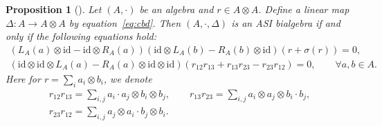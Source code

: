 \documentclass[pdftex]{sigma}
\numberwithin{equation}{section}
\newtheorem{Proposition}[Theorem]{Proposition}
{ \theoremstyle{definition}
	\newtheorem{Definition}[Theorem]{Definition}
	\newtheorem{Note}[Theorem]{Note}
	\newtheorem{Example}[Theorem]{Example}
	\newtheorem{Remark}[Theorem]{Remark} }
\newcommand{\id}{\mathrm{id}}
\begin{document}
\begin{Proposition}[{\cite[Theorem~2.3.5]{BaiDouble}}]\label{pro:cobasi}
Let $(A, \cdot)$ be an algebra and $r \in A \otimes A$.
 Define a linear map $\Delta\colon A \to A \otimes A$ by equation~\eqref{eq:cbd}.
 Then $(A, \cdot, \Delta)$ is an ASI bialgebra if and only if the following equations hold:
 \begin{gather}
 (L_A(a) \otimes \id - \id \otimes R_A(a))(\id \otimes L_A(b) - R_A(b) \otimes \id)(r + \sigma(r)) = 0, \label{eq:cobanti} \\
 (\id \otimes \id \otimes L_A(a) - R_A(a) \otimes \id \otimes \id)(r_{12}r_{13}+r_{13}r_{23}-r_{23}r_{12}) = 0, \qquad \forall a,b\in A. \label{eq:cobcoa}
 \end{gather}
 Here for $r = \sum_i a_i \otimes b_i$, we denote
 \begin{gather*}
 r_{12} r_{13} = \sum_{i,j} a_i \cdot a_j \otimes b_i \otimes b_j, \qquad
 r_{13} r_{23} = \sum_{i,j} a_i \otimes a_j \otimes b_i \cdot b_j, \\
 r_{23} r_{12} = \sum_{i,j} a_j \otimes a_i \cdot b_j \otimes b_i.
 \end{gather*}
\end{Proposition}
\end{document}
